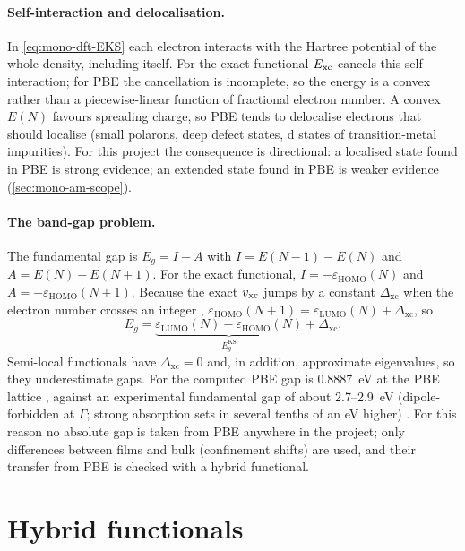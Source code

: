 \paragraph{Self-interaction and delocalisation.} In \cref{eq:mono-dft-EKS} each electron interacts with the Hartree
potential of the whole density, including itself. For the exact functional $E_{\mathrm{xc}}$ cancels this self-interaction; for
PBE the cancellation is incomplete, so the energy is a convex rather than a piecewise-linear function of fractional
electron number. A convex $E(N)$ favours spreading charge, so PBE tends to delocalise electrons that should localise
(small polarons, deep defect states, d states of transition-metal impurities). For this project the consequence is
directional: a localised state found in PBE is strong evidence; an extended state found in PBE is weaker evidence
(\cref{sec:mono-am-scope}).

\paragraph{The band-gap problem.} The fundamental gap is $E_g = I - A$ with $I = E(N-1) - E(N)$ and $A = E(N) -
E(N+1)$. For the exact functional, $I = -\varepsilon_{\mathrm{HOMO}}(N)$ and $A = -\varepsilon_{\mathrm{HOMO}}(N+1)$.
Because the exact $v_{\mathrm{xc}}$ jumps by a constant $\Delta_{\mathrm{xc}}$ when the electron number crosses an integer
\citep{PerdewLevy1983,ShamSchluter1983}, $\varepsilon_{\mathrm{HOMO}}(N+1) = \varepsilon_{\mathrm{LUMO}}(N) +
\Delta_{\mathrm{xc}}$, so
\begin{equation}
E_g = \underbrace{\varepsilon_{\mathrm{LUMO}}(N) - \varepsilon_{\mathrm{HOMO}}(N)}_{E_g^{\mathrm{KS}}} + \Delta_{\mathrm{xc}} .
\label{eq:mono-dft-gap}
\end{equation}
Semi-local functionals have $\Delta_{\mathrm{xc}} = 0$ and, in addition, approximate eigenvalues, so they underestimate
gaps. For \InO{} the computed PBE gap is 0.8887~eV at the PBE lattice , against an experimental fundamental
gap of about 2.7--2.9~eV (dipole-forbidden at $\Gamma$; strong absorption sets in several tenths of an eV higher)
\citep{Walsh2008,Irmscher2014}. For this reason no absolute gap is taken from PBE anywhere in the project; only
differences between films and bulk (confinement shifts) are used, and their transfer from PBE is checked with a hybrid
functional.

\section{Hybrid functionals}
\label{sec:mono-dft-hybrid}

